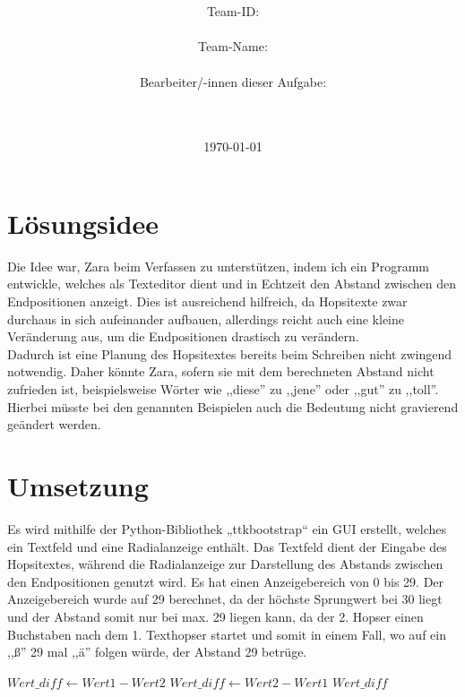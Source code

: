 \documentclass[a4paper,10pt,ngerman]{scrartcl}
\title{\textbf{\Huge\Aufgabe}}
\author{\LARGE Team-ID: \LARGE \TeamId \\\\
	\LARGE Team-Name: \LARGE \TeamName \\\\
	\LARGE Bearbeiter/-innen dieser Aufgabe: \\ 
	\LARGE \Namen\\\\}
\date{\LARGE\today}
\begin{document}
\maketitle
\tableofcontents

\vspace{0.5cm}


\section{Lösungsidee}
Die Idee war, Zara beim Verfassen zu unterstützen, indem ich ein Programm entwickle, welches 
als Texteditor dient und in Echtzeit den Abstand zwischen den Endpositionen anzeigt.
Dies ist ausreichend hilfreich, da Hopsitexte zwar durchaus in sich aufeinander aufbauen, allerdings reicht auch eine kleine Veränderung aus, um die Endpositionen drastisch zu verändern.\\
Dadurch ist eine Planung des Hopsitextes bereits beim Schreiben nicht zwingend notwendig.
Daher könnte Zara, sofern sie mit dem berechneten Abstand nicht zufrieden ist, beispielsweise
 Wörter wie ,,diese'' zu ,,jene'' oder ,,gut'' zu ,,toll''. Hierbei müsste bei den genannten 
 Beispielen auch die Bedeutung nicht gravierend geändert werden.

\section{Umsetzung}
Es wird mithilfe der Python-Bibliothek „ttkbootstrap“ ein GUI erstellt, welches ein Textfeld und 
eine Radialanzeige enthält. Das Textfeld dient der Eingabe des Hopsitextes, während die Radialanzeige
zur Darstellung des Abstands zwischen den Endpositionen genutzt wird. Es hat einen Anzeigebereich von 0 bis 
29. Der Anzeigebereich wurde auf 29 berechnet, da der höchste Sprungwert bei 30 liegt und der Abstand somit
nur bei max. 29 liegen kann, da der 2. Hopser einen Buchstaben nach dem 1. Texthopser startet und somit in einem Fall,
 wo auf ein ,,ß'' 29 mal ,,ä'' folgen würde, der Abstand 29 betrüge.\\

\begin{algorithmic}
            \State $Wert\_diff \gets Wert1 - Wert2$
        \Else
            \State $Wert\_diff \gets Wert2 - Wert1$
        \EndIf
        \Return $Wert\_diff$
    \EndFunction
\end{algorithmic}\\
\end{document}
